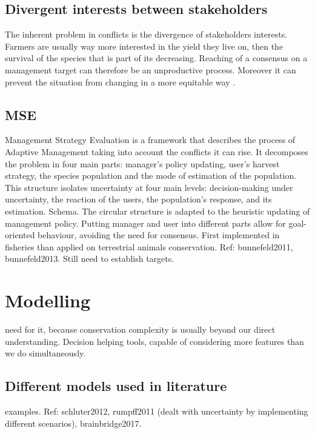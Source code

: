 \documentclass[12pt,a4paper]{article}
\begin{document}
\subsection{Divergent interests between stakeholders}
The inherent problem in conflicts is the divergence of stakeholders interests.
Farmers are usually way more interested in the yield they live on, then the survival of the species that is part of its decreasing.
Reaching of a consensus on a management target can therefore be an unproductive process.
Moreover it can prevent the situation from changing in a more equitable way \citep{peterson2005conservation}.

\subsection{MSE}

Management Strategy Evaluation is a framework that describes the process of Adaptive Management taking into account the conflicts it can rise.
It decomposes the problem in four main parts: manager's policy updating, user's harvest strategy, the species population and the mode of estimation of the population.
This structure isolates uncertainty at four main levels: decision-making under uncertainty, the reaction of the users, the population's response,
and its estimation.
Schema.
The circular structure is adapted to the heuristic updating of management policy.
Putting manager and user into different parts allow for goal-oriented behaviour, avoiding the need for consensus.
First implemented in fisheries than applied on terrestrial animals conservation. Ref: bunnefeld2011, bunnefeld2013.
Still need to establish targets.

\section{Modelling}

need for it, because conservation complexity is usually beyond our direct understanding. Decision helping tools, capable of considering more features than we do simultaneously.

\subsection{Different models used in literature}

examples. Ref: schluter2012, rumpff2011 (dealt with uncertainty by implementing different scenarios), brainbridge2017.
\end{document}
